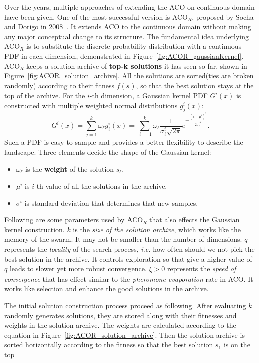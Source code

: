 Over the years, multiple approaches of extending the ACO on continuous domain have been given.
One of the most successful version is ACO$_{R}$, proposed by Socha and Dorigo in 2008~\cite{Socha:2008:ACOR}.
It extends ACO to the continuous domain without making any major conceptual change to its structure.
The fundamental idea underlying ACO$_{R}$ is to substitute the discrete probability distribution with a continuous PDF in each dimension, demonstrated in Figure~\ref{fig:ACOR_gaussianKernel}. 
ACO$_R$ keeps a solution archive of \textbf{top-k solutions} it has seen so far, shown in Figure~\ref{fig:ACOR_solution_archive}.
All the solutions are sorted(ties are broken randomly) according to their fitness $f(s)$, 
so that the best solution stays at the top of the archive.
For the $i$-th dimension, a Gaussian kernel PDF $G^i(x)$ is constructed with multiple weighted normal distributions $g_j^i(x)$: 
\begin{displaymath}
G^i(x) = \sum_{j = 1}^{k}\omega_{\ell}g_{\ell}^{i}(x) = 
\sum_{\ell = 1}^{k}\omega_{\ell} \frac{1}{\sigma_{\ell}^{i}\sqrt{2\pi}} e^{-\frac{ (x-\mu^i)^2 }{2 {\sigma^i_\ell}^2}}.
\end{displaymath}
Such a PDF is easy to sample and provides a better flexibility to describe the landscape.
Three elements decide the shape of the Gaussian kernel:
\begin{itemize}
\item $\omega_\ell$ is the \textbf{weight} of the solution $s_\ell$.
\item $\mu^i$ is $i$-th value of all the solutions in the archive.
\item $\sigma^i$ is standard deviation that determines that new samples.
\end{itemize}
Following are some parameters used by ACO$_R$ that also effects the Gaussian kernel construction.
$k$ is the \textit{size of the solution archive}, which works like the memory of the swarm.
It may not be smaller than the number of dimensions.
$q$ represents the \textit{locality} of the search process, \textit{i.e.} how often should we not pick the best solution in the archive.
It controls exploration so that give a higher value of $q$ leads to slower yet more robust convergence.
$\xi > 0$ represents the \textit{speed of convergence} that has effect similar to the \textit{pheromone evaporation} rate in ACO.
It works like selection and enhance the good solutions in the archive.

The initial solution construction process proceed as following.
After evaluating $k$ randomly generates solutions, they are stored along with their fitnesses and weights in the solution archive.
The weights are calculated according to the equation in Figure~\ref{fig:ACOR_solution_archive}.
Then the solution archive is sorted horizontally according to the fitness so that the best solution $s_1$ is on the top


